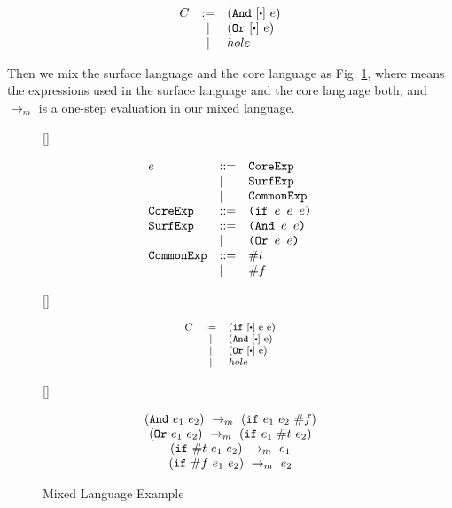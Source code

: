 \[
\begin{array}{lcl}
C &:=& (\m{And}~[\bigcdot]~e)\\
&|& (\m{Or}~[\bigcdot]~e)\\
&|&hole\\
\end{array}
\]

Then we mix the surface language and the core language as Fig. \ref{fig:mixexample}, where  means the expressions used in the surface language and the core language both, and $\to_m$ is a one-step evaluation in our mixed language.

\begin{figure}[thb]
\centering
{}[\linewidth]{\footnotesize
\begin{flushleft}
\[
\begin{array}{lll}
e &::=& \mbox{\tt CoreExp} \\
&|&\mbox{\tt SurfExp}\\
&|&\mbox{\tt CommonExp}\\
\mbox{\tt CoreExp} &::=& \texttt{(if~$e$~$e$~$e$)}\\
\mbox{\tt SurfExp} &::=& \texttt{(And~$e$~$e$)}\\
&|&\texttt{(Or~$e$~$e$)}\\
\mbox{\tt CommonExp} &::=& \#t\\
&|& \#f\\
\end{array}
\]
\end{flushleft}

}
[\linewidth]{
\begin{flushleft}
\[\footnotesize
\begin{array}{lcl}
C &:=& (\m{if}~[\bigcdot]~$e$~$e$)\\
&|& (\m{And}~[\bigcdot]~$e$)\\
&|& (\m{Or}~[\bigcdot]~$e$)\\
&|&hole\\
\end{array}
\]
\end{flushleft}

}

[\linewidth]{\footnotesize
\begin{flushleft}
\[
\begin{array}{c}
(\mbox{\tt And}~e_1~e_2) ~\rightarrow_m~(\mbox{\tt if}~e_1~e_2~\#f)\\
(\mbox{\tt Or}~e_1~e_2) ~\rightarrow_m~(\mbox{\tt if}~e_1~\#t~e_2)\\
(\mbox{\tt if}~\#t~e_1~e_2) ~\rightarrow_m~e_1\\
(\mbox{\tt if}~\#f~e_1~e_2) ~\rightarrow_m~e_2 
\end{array}
\]
\end{flushleft}

}

\caption{Mixed Language Example}
\label{fig:mixexample}
\end{figure}

